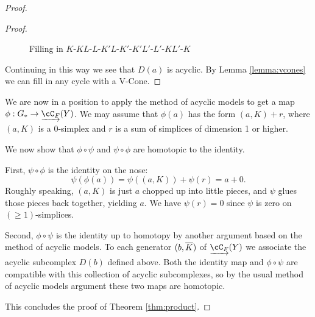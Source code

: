 \begin{proof}
\begin{proof}
\begin{figure}[t] \centering
{}
\caption{Filling in $K$-$KL$-$L$-$K'L$-$K'$-$K'L'$-$L'$-$KL'$-$K$}
\label{zzz5}
\end{figure}

Continuing in this way we see that $D(a)$ is acyclic.
By Lemma \ref{lemma:vcones} we can fill in any cycle with a V-Cone.
\end{proof}

We are now in a position to apply the method of acyclic models to get a map
$\phi:G_* \to \cl{\cC_F}(Y)$.
We may assume that $\phi(a)$ has the form $(a, K) + r$, where $(a, K)$ is a 0-simplex
and $r$ is a sum of simplices of dimension 1 or higher.

We now show that $\phi\circ\psi$ and $\psi\circ\phi$ are homotopic to the identity.

First, $\psi\circ\phi$ is the identity on the nose:
\[
	\psi(\phi(a)) = \psi((a,K)) + \psi(r) = a + 0.
\]
Roughly speaking, $(a, K)$ is just $a$ chopped up into little pieces, and 
$\psi$ glues those pieces back together, yielding $a$.
We have $\psi(r) = 0$ since $\psi$ is zero on $(\ge 1)$-simplices.
 
Second, $\phi\circ\psi$ is the identity up to homotopy by another argument based on the method of acyclic models.
To each generator $(b, \overline{K})$ of $\cl{\cC_F}(Y)$ we associate the acyclic subcomplex $D(b)$ defined above.
Both the identity map and $\phi\circ\psi$ are compatible with this
collection of acyclic subcomplexes, so by the usual method of acyclic models argument these two maps
are homotopic.

This concludes the proof of Theorem \ref{thm:product}.
\end{proof}

